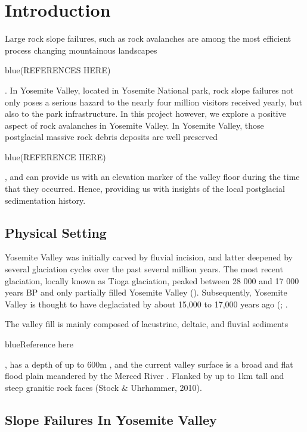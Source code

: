 \documentclass[5p]{elsarticle}
\newcommand{\COMON}{\begin{color}{blue}}
\newcommand{\COMOFF}{\end{color}}
\begin{document}






\section{Introduction}

Large rock slope failures, such as rock avalanches are among the most efficient process changing mountainous landscapes \COMON (REFERENCES HERE) \COMOFF. In Yosemite Valley, located in Yosemite National park, rock slope failures not only poses a serious hazard to the nearly four million visitors received yearly, but also to the park infrastructure. In this project however, we explore a positive aspect of rock avalanches in Yosemite Valley. In Yosemite Valley, those postglacial massive rock debris deposits  are well preserved \COMON (REFERENCE HERE) \COMOFF, and can provide us with an elevation marker of the valley floor during the time that they occurred.  Hence, providing us with insights of the local postglacial sedimentation history.  
\bigskip



\subsection{Physical Setting}

Yosemite Valley was initially carved by fluvial incision, and latter deepened by several glaciation cycles over the past several million years. The most recent glaciation, locally known as Tioga glaciation, peaked between 28 000 and 17 000 years BP and only partially filled  Yosemite Valley (\cite{huber1987geologic}). Subsequently, Yosemite Valley is thought to have deglaciated by about 15,000 to 17,000 years ago (\cite{huber1987geologic};  \cite{Wieczorek+1996}.

The valley fill is mainly composed of lacustrine, deltaic, and fluvial sediments \COMON Reference here\COMOFF, has a depth of up to 600m \cite{gutenberg1956seismic}, and the current valley surface is a broad and flat flood plain meandered by the Merced River \cite{Wieczorek+1996}. Flanked by up to 1km tall and steep granitic rock faces (Stock & Uhrhammer, 2010).
\bigskip
    
    
    
\subsection{Slope Failures In Yosemite Valley}
\end{document}
